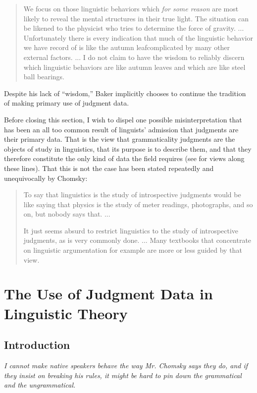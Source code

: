 \begin{quote}
We focus on those linguistic behaviors which \textit{for some reason} are most likely to reveal the mental structures in their true light. The situation can be likened to the physicist who tries to determine the force of gravity. ... Unfortunately there is every indication that much of the linguistic behavior we have record of is like the autumn leaf\schdash{}complicated by many other external factors. ... I do not claim to have the wisdom to reliably discern which linguistic behaviors are like autumn leaves and which are like steel ball bearings. \citep[29]{Baker1988}
\end{quote}

\noindent
Despite his lack of ``wisdom,'' Baker implicitly chooses to continue the tradition of making primary use of judgment data.

Before closing this section, I wish to dispel one possible misinterpretation that has been an all too common result of linguists' admission that judgments are their primary data. That is the view that grammaticality judgments are the objects of study in linguistics, that its purpose is to describe them, and that they therefore constitute the only kind of data the field requires (see \citet{Sampson1975} for views along these lines). That this is not the case has been stated repeatedly and unequivocally by Chomsky:

\begin{quote}
To say that linguistics is the study of introspective judgments would be like saying that physics is the study of meter readings, photographs, and so on, but nobody says that. ...

It just seems absurd to restrict linguistics to the study of introspective judgments, as is very commonly done. ... Many textbooks that concentrate on linguistic argumentation for example are more or less guided by that view. \citep[33\textendash{}34]{Chomsky1982}
\end{quote}

\section{The Use of Judgment Data in Linguistic Theory}  \label{sec:2.3}
\subsection{Introduction} \label{sec:2.3.1}

\epigraph{\itshape I cannot make native speakers behave the way Mr. Chomsky says they do, and if they insist on breaking his rules, it might be hard to pin down the grammatical and the ungrammatical.\\[-2\baselineskip]}{\citep{Sledd1962}}

